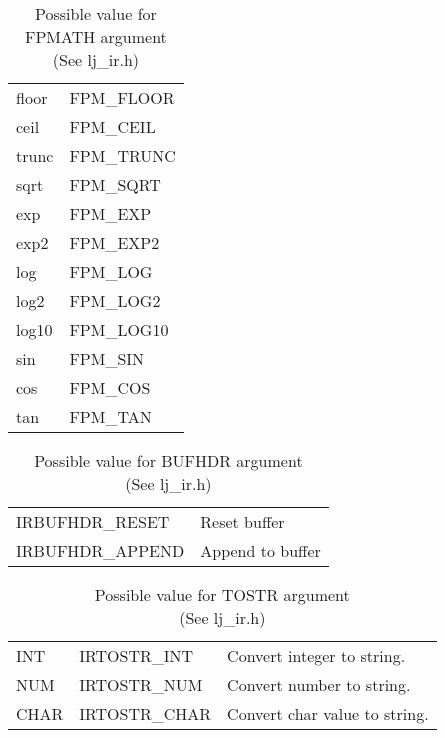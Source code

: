 \begin{table}
\centering
\begin{tabular}{|l|l|}
\hline
floor & FPM\_FLOOR \\
ceil  & FPM\_CEIL  \\
trunc & FPM\_TRUNC \\
sqrt  & FPM\_SQRT  \\
exp   & FPM\_EXP   \\
exp2  & FPM\_EXP2  \\
log   & FPM\_LOG   \\
log2  & FPM\_LOG2  \\
log10 & FPM\_LOG10 \\
sin   & FPM\_SIN   \\
cos   & FPM\_COS   \\
tan   & FPM\_TAN   \\
\hline
\end{tabular}
\caption{
  Possible value for FPMATH argument \\(See lj\_ir.h)
}
\label{tab:dump-fpmath}
\end{table}
\begin{table}
\centering
\begin{tabular}{|l|l|}
\hline
IRBUFHDR\_RESET  & Reset buffer \\
IRBUFHDR\_APPEND & Append to buffer \\
\hline
\end{tabular}
\caption{
  Possible value for BUFHDR argument \\(See lj\_ir.h)
}
\label{tab:dump-bufhdr}
\end{table}

\begin{table}
\centering
\begin{tabular}{|l|l|l|}
\hline
INT  & IRTOSTR\_INT  & Convert integer to string.  \\
NUM  & IRTOSTR\_NUM  & Convert number to string.  \\
CHAR & IRTOSTR\_CHAR & Convert char value to string.  \\\hline
\end{tabular}
\caption{
  Possible value for TOSTR argument \\(See lj\_ir.h)
}
\label{tab:dump-tostr}
\end{table}